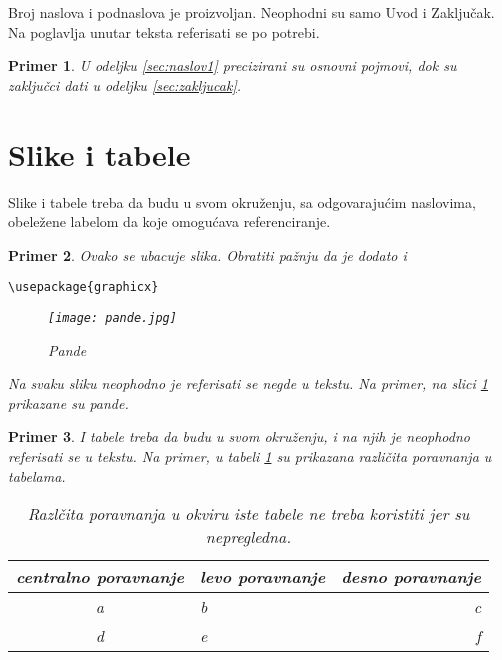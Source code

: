 \documentclass[a4paper]{article}
\newtheorem{primer}{Primer}[section]
\begin{document}
Broj naslova i podnaslova je proizvoljan. Neophodni su samo Uvod i Zaključak. Na poglavlja unutar teksta referisati se po potrebi. 
\begin{primer}
U odeljku \ref{sec:naslov1} precizirani su osnovni pojmovi, dok su zaključci dati u odeljku \ref{sec:zakljucak}.
\end{primer}




\section{Slike i tabele}
\label{slike_i_tabele}

Slike i tabele treba da budu u svom okruženju, sa odgovarajućim naslovima, obeležene labelom da koje omogućava referenciranje. 

\begin{primer} Ovako se ubacuje slika. Obratiti pažnju da je dodato i 
\begin{verbatim}
\usepackage{graphicx}
\end{verbatim}

\begin{figure}[h!]
\begin{center}
\texttt{[image: pande.jpg]}
\end{center}
\caption{Pande}
\label{fig:pande}
\end{figure}

Na svaku sliku neophodno je referisati se negde u tekstu. Na primer, na slici \ref{fig:pande} prikazane su pande. 
\end{primer}

\begin{primer} I tabele treba da budu u svom okruženju, i na njih je neophodno referisati se u tekstu. Na primer, u tabeli \ref{tab:tabela1} su prikazana različita poravnanja u tabelama.

\begin{table}[h!]
\begin{center}
\caption{Razlčita poravnanja u okviru iste tabele ne treba koristiti jer su nepregledna.}
\begin{tabular}{|c|l|r|} \hline
centralno poravnanje& levo poravnanje& desno poravnanje\\ \hline
a &b&c\\ \hline
d &e&f\\ \hline
\end{tabular}
\label{tab:tabela1}
\end{center}
\end{table}

\end{primer}
\end{document}
